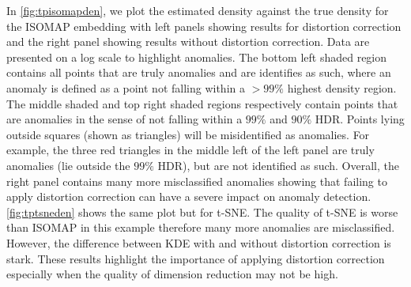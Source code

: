 \documentclass[11pt,a4paper,]{article}
\begin{document}
In \autoref{fig:tpisomapden}, we plot the estimated density against the true density for the ISOMAP embedding with left panels showing results for distortion correction and the right panel showing results without distortion correction. Data are presented on a log scale to highlight anomalies. The bottom left shaded region contains all points that are truly anomalies and are identifies as such, where an anomaly is defined as a point not falling within a \(>99\%\) highest density region. The middle shaded and top right shaded regions respectively contain points that are anomalies in the sense of not falling within a \(99\%\) and \(90\%\) HDR. Points lying outside squares (shown as triangles) will be misidentified as anomalies. For example, the three red triangles in the middle left of the left panel are truly anomalies (lie outside the \(99\%\) HDR), but are not identified as such. Overall, the right panel contains many more misclassified anomalies showing that failing to apply distortion correction can have a severe impact on anomaly detection. \autoref{fig:tptsneden} shows the same plot but for t-SNE. The quality of t-SNE is worse than ISOMAP in this example therefore many more anomalies are misclassified. However, the difference between KDE with and without distortion correction is stark. These results highlight the importance of applying distortion correction especially when the quality of dimension reduction may not be high.
\end{document}
